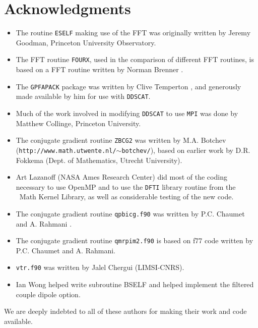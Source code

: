 \section{Acknowledgments}

\begin{itemize}
\item The routine {\tt ESELF} making use of the FFT was originally written by 
Jeremy Goodman, Princeton University Observatory.  
\item The FFT routine {\tt FOURX}, used in the comparison of different
FFT routines,
is based on a FFT routine written by Norman
Brenner \citet{Brenner_1969}. 
\item The {\tt GPFAPACK} package was written by Clive Temperton 
\citep{Temperton_1992}, and
generously made available by him for use with {\tt DDSCAT}.
\item Much of the work involved in modifying {\tt DDSCAT} to use {\tt MPI} 
was done by Matthew Collinge, Princeton University.
\item The conjugate gradient routine {\tt ZBCG2} was written by
M.A. Botchev \\
({\tt http://www.math.utwente.nl/$\sim$botchev/}), based on
earlier work by D.R. Fokkema (Dept. of Mathematics, Utrecht University).
\item Art Lazanoff (NASA Ames Research Center) did most of the coding necessary
to use OpenMP and to use the {\tt DFTI} library routine from the
\Intel\ Math Kernel Library, as well as considerable testing of the new
code.  
\item The conjugate gradient routine {\tt qpbicg.f90} was written
by P.C. Chaumet and A. Rahmani \citep{Chaumet+Rahmani_2009}.
\item The conjugate gradient routine {\tt qmrpim2.f90} is based on f77
code written by P.C. Chaumet and A. Rahmani.
\item {\tt vtr.f90} was written by Jalel Chergui (LIMSI-CNRS).
\item Ian Wong helped write subroutine BSELF and helped implement
the filtered couple dipole option.
\end{itemize}
We are deeply 
indebted to all of these authors for making their work and code available.  

